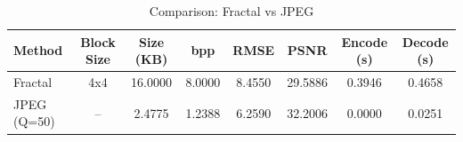 \begin{table}[h]
\caption{Comparison: Fractal vs JPEG}
\label{tab:compression}
\begin{tabular}{lccccccc}
\toprule
Method & Block Size & Size (KB) & bpp & RMSE & PSNR & Encode (s) & Decode (s) \\
\midrule
Fractal & 4x4 & 16.0000 & 8.0000 & 8.4550 & 29.5886 & 0.3946 & 0.4658 \\
JPEG (Q=50) & -- & 2.4775 & 1.2388 & 6.2590 & 32.2006 & 0.0000 & 0.0251 \\
\bottomrule
\end{tabular}
\end{table}
